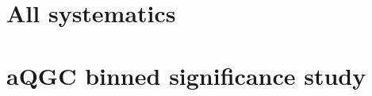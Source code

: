 
%

\clearpage
\section{All systematics}
\label{app:allsyst}


%

\clearpage
\section{aQGC binned significance study}
\label{app:binnedsig}

